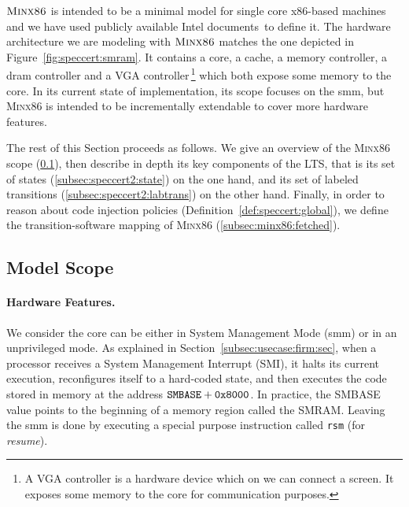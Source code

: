 $\textsc{Minx86}$ is intended to be a minimal model for single core x86-based
machines and we have used publicly available Intel
documents\,\cite{intel2013celeron,intel2009mch,intel2014manual} to define it.
%
The hardware architecture we are modeling with $\textsc{Minx86}$ matches the
one depicted in Figure~\ref{fig:speccert:smram}. It contains a core, a cache, a
memory controller, a \ac{dram} controller and a VGA controller\,\footnote{A VGA
  controller is a hardware device which on we can connect a screen. It exposes
  some memory to the core for communication purposes.} which both expose some
memory to the core.
%
In its current state of implementation, its scope focuses on the \ac{smm}, but
{\scshape Minx86} is intended to be incrementally extendable to cover more
hardware features.

The rest of this Section proceeds as follows.
%
We give an overview of the {\scshape Minx86} scope (\ref{sec:speccert2:scope}),
then describe in depth its key components of the LTS, that is its set of states
(\ref{subsec:speccert2:state}) on the one hand, and its set of labeled
transitions (\ref{subsec:speccert2:labtrans}) on the other hand.
%
Finally, in order to reason about code injection policies
(Definition~\ref{def:speccert:global}), we define the transition-software
mapping of {\scshape Minx86} (\ref{subsec:minx86:fetched}).

\subsection{Model Scope}
\label{sec:speccert2:scope}

\paragraph{Hardware Features.}
%
We consider the core  can be either in System Management Mode
(\ac{smm}) or in an unprivileged mode.
%
As explained in Section~\ref{subsec:usecase:firm:sec}, when a processor receives
a System Management Interrupt (SMI), it halts its current execution,
reconfigures itself to a hard-coded state, and then executes the code stored in
memory at the address $\mathtt{SMBASE} + \mathtt{0x8000}$.
%
In practice, the SMBASE value points to the beginning of a memory region called
the SMRAM.
%
Leaving the \ac{smm} is done by executing a special purpose instruction called
\texttt{rsm} (for \emph{resume}).

